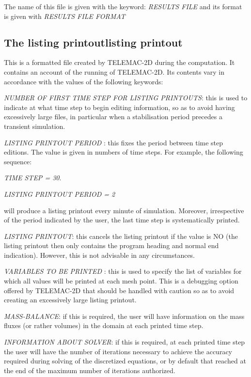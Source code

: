  The name of this file is given with the keyword: \textit{RESULTS FILE} and its format is given with \textit{RESULTS FILE FORMAT}


\subsection{ The listing printoutlisting printout}

 This is a formatted file created by TELEMAC-2D during the computation. It contains an account of the running of TELEMAC-2D. Its contents vary in accordance with the values of the following keywords:

 \textit{NUMBER OF FIRST TIME STEP FOR LISTING PRINTOUTS}: this is used to indicate at what time step to begin editing information, so as to avoid having excessively large files, in particular when a stabilisation period precedes a transient simulation.

 \textit{LISTING PRINTOUT PERIOD }: this fixes the period between time step editions. The value is given in numbers of time steps. For example, the following sequence:

    \textit{TIME STEP = 30}.

    \textit{LISTING PRINTOUT PERIOD = 2}

 will produce a listing printout every minute of simulation. Moreover, irrespective of the period indicated by the user, the last time step is systematically printed.

 \textit{LISTING PRINTOUT}: this cancels the listing printout if the value is NO (the listing printout then only contains the program heading and normal end indication). However, this is not advisable in any circumstances.

 \textit{VARIABLES TO BE PRINTED }: this is used to specify the list of variables for which all values will be printed at each mesh point. This is a debugging option offered by TELEMAC-2D that should be handled with caution so as to avoid creating an excessively large listing printout.

 \textit{MASS-BALANCE}: if this is required, the user will have information on the mass fluxes (or rather volumes) in the domain at each printed time step.

 \textit{INFORMATION ABOUT SOLVER}: if this is required, at each printed time step the user will have the number of iterations necessary to achieve the accuracy required during solving of the discretized equations, or by default that reached at the end of the maximum number of iterations authorized.

